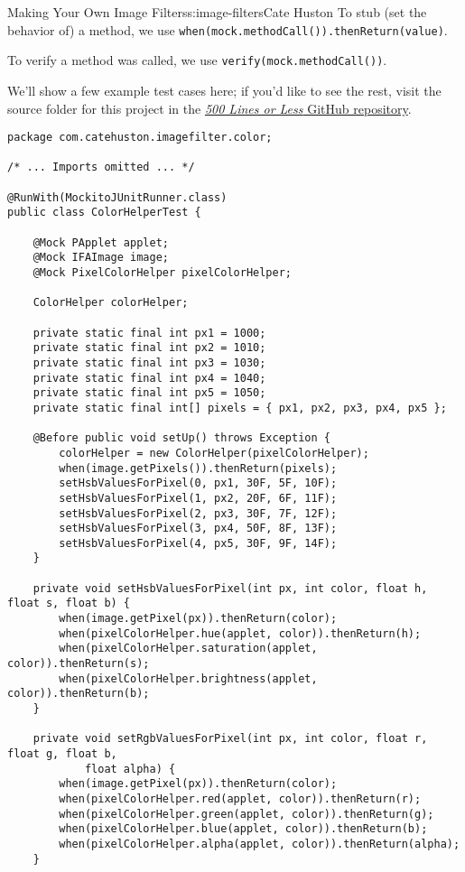 \begin{aosachapter}{Making Your Own Image Filters}{s:image-filters}{Cate Huston}
To stub (set the behavior of) a method, we use
\texttt{when(mock.methodCall()).thenReturn(value)}.

To verify a method was called, we use
\texttt{verify(mock.methodCall())}.

We'll show a few example test cases here; if you'd like to see the rest,
visit the source folder for this project in the
\href{https://github.com/aosabook/500lines/tree/master/image-filters}{\emph{500
Lines or Less} GitHub repository}.

\begin{verbatim}
package com.catehuston.imagefilter.color;

/* ... Imports omitted ... */

@RunWith(MockitoJUnitRunner.class)
public class ColorHelperTest {

    @Mock PApplet applet;
    @Mock IFAImage image;
    @Mock PixelColorHelper pixelColorHelper;

    ColorHelper colorHelper;

    private static final int px1 = 1000;
    private static final int px2 = 1010;
    private static final int px3 = 1030;
    private static final int px4 = 1040;
    private static final int px5 = 1050;
    private static final int[] pixels = { px1, px2, px3, px4, px5 };

    @Before public void setUp() throws Exception {
        colorHelper = new ColorHelper(pixelColorHelper);
        when(image.getPixels()).thenReturn(pixels);
        setHsbValuesForPixel(0, px1, 30F, 5F, 10F);
        setHsbValuesForPixel(1, px2, 20F, 6F, 11F);
        setHsbValuesForPixel(2, px3, 30F, 7F, 12F);
        setHsbValuesForPixel(3, px4, 50F, 8F, 13F);
        setHsbValuesForPixel(4, px5, 30F, 9F, 14F);
    }

    private void setHsbValuesForPixel(int px, int color, float h, float s, float b) {
        when(image.getPixel(px)).thenReturn(color);
        when(pixelColorHelper.hue(applet, color)).thenReturn(h);
        when(pixelColorHelper.saturation(applet, color)).thenReturn(s);
        when(pixelColorHelper.brightness(applet, color)).thenReturn(b);
    }

    private void setRgbValuesForPixel(int px, int color, float r, float g, float b, 
            float alpha) {
        when(image.getPixel(px)).thenReturn(color);
        when(pixelColorHelper.red(applet, color)).thenReturn(r);
        when(pixelColorHelper.green(applet, color)).thenReturn(g);
        when(pixelColorHelper.blue(applet, color)).thenReturn(b);
        when(pixelColorHelper.alpha(applet, color)).thenReturn(alpha);
    }


\end{verbatim}
\end{aosachapter}
